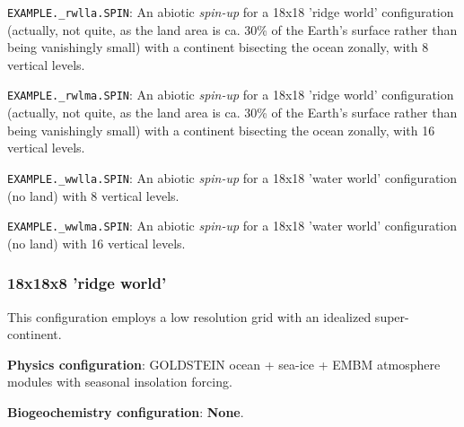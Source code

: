\documentclass[10pt,twoside]{article}
\begin{document}
        \begin{compactenum}
        
                \item \texttt{EXAMPLE.\_rwlla.SPIN}: An abiotic \textit{spin-up} for a 18x18 'ridge world' configuration (actually, not quite, as the land area is ca. 30\% of the Earth's surface rather than being vanishingly small) with a continent bisecting the ocean zonally, with 8 vertical levels.
                
                \item \texttt{EXAMPLE.\_rwlma.SPIN}: An abiotic \textit{spin-up} for a 18x18 'ridge world' configuration (actually, not quite, as the land area is ca. 30\% of the Earth's surface rather than being vanishingly small) with a continent bisecting the ocean zonally, with 16 vertical levels.
        
                \item \texttt{EXAMPLE.\_wwlla.SPIN}: An abiotic \textit{spin-up} for a 18x18 'water world' configuration (no land) with 8 vertical levels.
                
                \item \texttt{EXAMPLE.\_wwlma.SPIN}: An abiotic \textit{spin-up} for a 18x18 'water world' configuration (no land) with 16 vertical levels.
                                
        \end{compactenum}


\subsubsection{18x18x8 'ridge world'}\label{EXAMPLE.rwlla.SPIN}

This configuration employs a low resolution grid with an idealized super-continent.

\noindent \textbf{Physics configuration}: GOLDSTEIN ocean + sea-ice + EMBM atmosphere modules with seasonal insolation forcing.

\noindent \textbf{Biogeochemistry configuration}: \textbf{None}.
\end{document}
